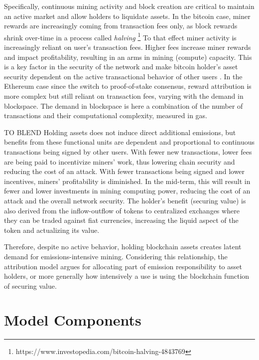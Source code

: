 \documentclass[11pt]{report}
\begin{document}

Specifically, continuous mining activity and block creation are critical to maintain an active market and allow holders to liquidate assets. In the bitcoin case, miner rewards are increasingly coming from transaction fees only, as block rewards shrink over-time in a process called \textit{halving} \footnote{https://www.investopedia.com/bitcoin-halving-4843769} To that effect miner activity is increasingly reliant on user's transaction fees. Higher fees increase miner rewards and impact profitability, resulting in an arms in mining (compute) capacity. This is a key factor in the security of the network and make bitcoin holder's asset security dependent on the active transactional behavior of other users \cite{easleyMiningMarketsEvolution2019}. In the Ethereum case since the switch to proof-of-stake consensus, reward attribution is more complex but still reliant on transaction fees, varying with the demand in blockspace. The demand in blockspace is here a combination of the number of transactions and their computational complexity, measured in gas.

TO BLEND
Holding assets does not induce direct additional emissions, but benefits from these functional units are dependent and proportional to continuous transactions being signed by other users. With fewer new transactions, lower fees are being paid to incentivize miners' work, thus lowering chain security and reducing the cost of an attack. With fewer transactions being signed and lower incentives, miners' profitability is diminished.  In the mid-term, this will result in fewer and lower investments in mining computing power, reducing the cost of an attack and the overall network security. The holder's benefit (securing value) is also derived from the inflow-outflow of tokens to centralized exchanges where they can be traded against fiat currencies, increasing the liquid aspect of the token and actualizing its value. 

Therefore, despite no active behavior, holding blockchain assets creates latent demand for emissions-intensive mining. Considering this relationship, the attribution model argues for allocating part of emission responsibility to asset holders, or more generally how intensively a use is using the blockchain function of securing value.

\section{Model Components}
\end{document}
